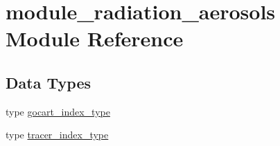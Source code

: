 \hypertarget{namespacemodule__radiation__aerosols}{}\section{module\+\_\+radiation\+\_\+aerosols Module Reference}
\label{namespacemodule__radiation__aerosols}
\subsection*{Data Types}
\begin{DoxyCompactItemize}
\item 
type \hyperlink{structmodule__radiation__aerosols_1_1gocart__index__type}{gocart\+\_\+index\+\_\+type}
\item 
type \hyperlink{structmodule__radiation__aerosols_1_1tracer__index__type}{tracer\+\_\+index\+\_\+type}
\end{DoxyCompactItemize}
